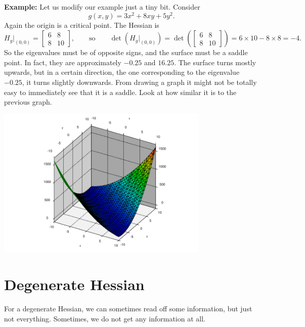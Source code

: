 \documentclass[12pt]{article}
\begin{document}
\bigskip

\textbf{Example:} Let us modify our example just a tiny bit.
Consider
$$
g(x,y) = 3 x^2 + 8xy  + 5y^2 .
$$
Again the origin is a critical point.
The Hessian is
$$
H_g\big|_{(0,0)} =
\begin{bmatrix}
6 & 8 \\
8 & 10
\end{bmatrix}
,
\qquad \text{so} \qquad
\det(H_g\big|_{(0,0)}) = 
\det \left(
\begin{bmatrix}
6 & 8 \\
8 & 10
\end{bmatrix}
\right)
=
6 \times 10 - 8 \times 8 = -4.
$$
So the eigenvalues must be of opposite signs, and the surface must be a
saddle point.  In fact, they are approximately $-0.25$ and $16.25$.
The surface turns mostly upwards, but in a certain direction, the one
corresponding to the eigenvalue $-0.25$, it turns
slightly downwards.  From drawing a graph it might not be totally easy to
immediately see that it is a saddle.  Look at how similar it is to the
previous graph.
\begin{center}
\includegraphics[width=4.0in]{mostly-upwards.pdf}
\end{center}

\bigskip

\section{Degenerate Hessian}

For a degenerate Hessian, we can sometimes read off some information, but
just not everything.  Sometimes, we do not get any information at all.
\end{document}
